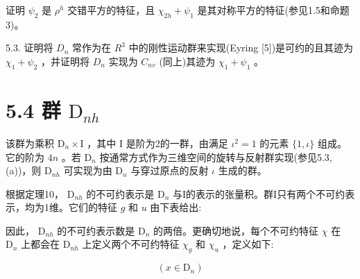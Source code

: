 \documentclass[10pt]{article}
\begin{document}
证明 \({\psi }_{2}\) 是 \({\rho }^{h}\) 交错平方的特征，且 \({\chi }_{2h} + {\psi }_{1}\) 是其对称平方的特征(参见1.5和命题3)。

5.3. 证明将 \({D}_{n}\) 常作为在 \({R}^{3}\) 中的刚性运动群来实现(Eyring [5])是可约的且其迹为 \({\chi }_{1} + {\psi }_{2}\) ，并证明将 \({D}_{n}\) 实现为 \({C}_{nv}\) (同上)其迹为 \({\chi }_{1} + {\psi }_{1}\) 。

\section*{5.4 群 \({\mathrm{D}}_{nh}\)}

该群为乘积 \({\mathrm{D}}_{n} \times  \mathrm{I}\) ，其中 \(\mathrm{I}\) 是阶为2的一群，由满足 \({\iota }^{2} = 1\) 的元素 \(\{ 1,\iota \}\) 组成。它的阶为 \({4n}\) 。若 \({\mathrm{D}}_{n}\) 按通常方式作为三维空间的旋转与反射群实现(参见5.3,(a))，则 \({\mathrm{D}}_{nh}\) 可实现为由 \({\mathrm{D}}_{n}\) 与穿过原点的反射 \(\iota\) 生成的群。

根据定理10， \({\mathrm{D}}_{nh}\) 的不可约表示是 \({\mathrm{D}}_{n}\) 与I的表示的张量积。群I只有两个不可约表示，均为1维。它们的特征 \(g\) 和 \(u\) 由下表给出:

\begin{center}
\end{center}

因此， \({\mathrm{D}}_{nh}\) 的不可约表示数是 \({\mathrm{D}}_{n}\) 的两倍。更确切地说，每个不可约特征 \(\chi\) 在 \({\mathrm{D}}_{n}\) 上都会在 \({\mathrm{D}}_{nh}\) 上定义两个不可约特征 \({\chi }_{g}\) 和 \({\chi }_{u}\) ，定义如下:

\[
\left( {x \in  {\mathrm{D}}_{n}}\right)
\]

\begin{center}
\end{center}
\end{document}
